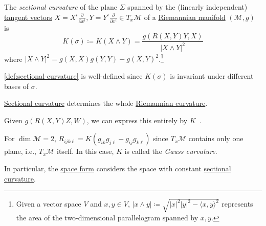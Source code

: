 \begin{definition}\label{def:sectional-curvature}
	The \emph{sectional curvature} of the plane \(\Sigma \) spanned by the (linearly independent) \hyperref[def:tangent-vector]{tangent vectors} \(X = X^i \frac{\partial }{\partial x^i} , Y= Y^i \frac{\partial }{\partial x^i} \in T_x \mathcal{M} \) of a \hyperref[def:Riemannian-manifold]{Riemannian manifold} \((\mathcal{M}, g)\) is
	\[
		K(\sigma ) \coloneqq K(X \wedge Y) = \frac{g(R(X, Y) Y, X)}{\vert X\wedge Y \vert^2 }
	\]
	where \(\vert X \wedge Y \vert ^2 = g(X, X) g(Y, Y) - g(X, Y)^2\).\footnote{Given a vector space \(V\) and \(x, y\in V\), \(\vert x \wedge y \vert \coloneqq \sqrt{\vert x \vert ^2 \vert y \vert ^{2} - \langle x, y \rangle ^2} \) represents the area of the two-dimensional parallelogram spanned by \(x, y\).}
\end{definition}

\begin{note}
	\autoref{def:sectional-curvature} is well-defined since \(K(\sigma )\) is invariant under different bases of \(\sigma \).
\end{note}

\begin{remark}
	\hyperref[def:sectional-curvature]{Sectional curvature} determines the whole \hyperref[def:Riemannian-curvature]{Riemannian curvature}.
\end{remark}
\begin{explanation}
	Given \(g(R(X, Y)Z, W)\), we can express this entirely by \(K\)~\cite[Lemma 3.3]{flaherty2013riemannian}.
\end{explanation}

\begin{remark}\label{rmk:Gauss-curvature}
	For \(\dim \mathcal{M} = 2\), \(R_{ijk\ell} = K(g_{ik} g_{j \ell } - g_{ij} g_{k \ell })\) since \(T_x \mathcal{M} \) contains only one plane, i.e., \(T_x \mathcal{M} \) itself. In this case, \(K\) is called the \emph{Gauss curvature}.
\end{remark}

In particular, the \hyperref[def:space-form]{space form} considers the space with constant \hyperref[def:sectional-curvature]{sectional curvature}.

